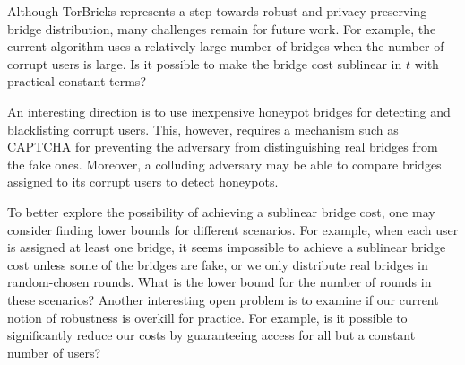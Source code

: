 \documentclass[letterpaper,twocolumn,10pt]{article}
\newcommand{\bricks}{}
\def\bricks/{\mbox{TorBricks}}
\begin{document}
Although \bricks/ represents a step towards robust and privacy-preserving bridge distribution, many challenges remain for future work. For example, the current algorithm uses a relatively large number of bridges when the number of corrupt users is large. Is it possible to make the bridge cost sublinear in $t$ with practical constant terms? 

An interesting direction is to use inexpensive honeypot bridges for detecting and blacklisting corrupt users. This, however, requires a mechanism such as CAPTCHA for preventing the adversary from distinguishing real bridges from the fake ones. Moreover, a colluding adversary may be able to compare bridges assigned to its corrupt users to detect honeypots.

To better explore the possibility of achieving a sublinear bridge cost, one may consider finding lower bounds for different scenarios. For example, when each user is assigned at least one bridge, it seems impossible to achieve a sublinear bridge cost unless some of the bridges are fake, or we only distribute real bridges in random-chosen rounds. What is the lower bound for the number of rounds in these scenarios?
Another interesting open problem is to examine if our current notion of robustness is overkill for practice. For example, is it possible to significantly reduce our costs by guaranteeing access for all but a constant number of users? %




\appendix
\end{document}
